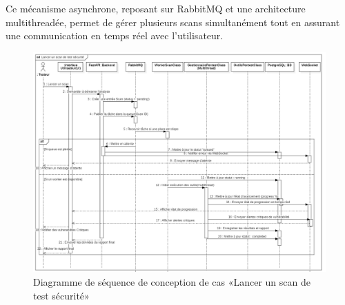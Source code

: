 Ce mécanisme asynchrone, reposant sur RabbitMQ et une architecture multithreadée, permet de gérer plusieurs scans simultanément tout en assurant une communication en temps réel avec l’utilisateur.
\begin{figure}[H]
    \centering
    \includegraphics[width=\linewidth]{chapitres/ch3Sp1/section/sprint2/img/seq-lancerSp1.2.png}
    \caption{\centering Diagramme de séquence de conception de cas «Lancer un scan de test sécurité»}
    \label{fig:seq1ScanAnalyse}
\end{figure}
\vspace{-0.6cm}

